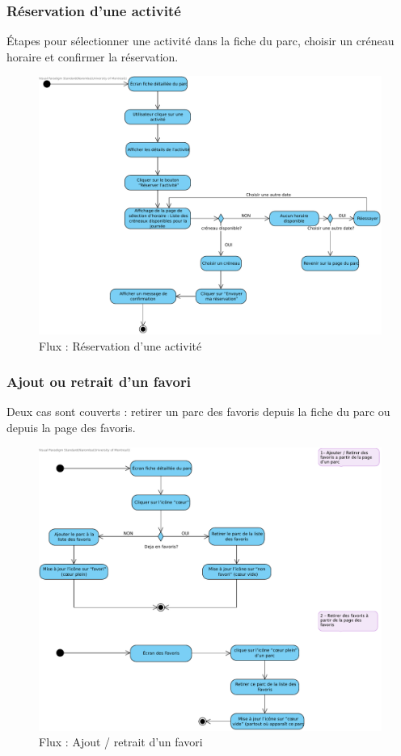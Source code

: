 \documentclass[12pt,a4paper]{article}
\begin{document}
\subsubsection{Réservation d'une activité}

Étapes pour sélectionner une activité dans la fiche du parc, choisir un créneau horaire et confirmer la réservation.

\begin{figure}[H]
  \centering
  \includegraphics[width=0.9\linewidth]{attachments/Reservation_Activite.pdf}
  \caption{Flux : Réservation d'une activité}
\end{figure}

\subsubsection{Ajout ou retrait d'un favori}

Deux cas sont couverts : retirer un parc des favoris depuis la fiche du parc ou depuis la page des favoris.

\begin{figure}[H]
  \centering
  \includegraphics[width=0.9\linewidth]{attachments/Ajout_retrait_d_un_favori.pdf}
  \caption{Flux : Ajout / retrait d'un favori}
\end{figure}
\end{document}
